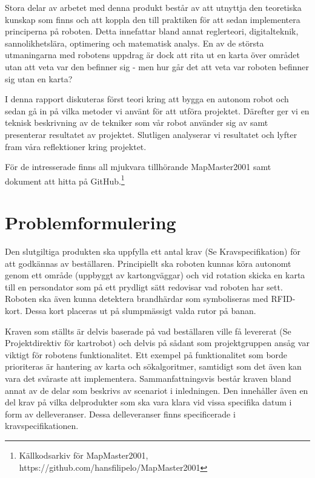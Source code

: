 \documentclass[a4paper,12pt,fleqn]{article}
\begin{document}
Stora delar av arbetet med denna produkt består av att utnyttja den teoretiska kunskap som finns och att koppla den till praktiken för att sedan implementera principerna på roboten. 
Detta innefattar bland annat reglerteori, digitalteknik, sannolikhetslära, optimering och matematisk analys. En av de största utmaningarna med robotens uppdrag är dock att rita ut en karta över området utan att veta var den befinner sig - men hur går det att veta var roboten befinner sig utan en karta?

I denna rapport diskuteras först teori kring att bygga en autonom robot och sedan gå in på vilka metoder vi använt för att utföra projektet. Därefter ger vi en teknisk beskrivning av de tekniker som vår robot använder sig av samt presenterar resultatet av projektet. Slutligen analyserar vi resultatet och lyfter fram våra reflektioner kring projektet. 

För de intresserade finns all mjukvara tillhörande MapMaster2001 samt dokument att hitta på GitHub.\footnote{Källkodsarkiv för MapMaster2001, https://github.com/hansfilipelo/MapMaster2001}

\section{Problemformulering}

Den slutgiltiga produkten ska uppfylla ett antal krav (Se Kravspecifikation) för att godkännas av beställaren. Principiellt ska roboten kunnas köra autonomt genom ett område (uppbyggt av kartongväggar) och vid rotation skicka en karta till en persondator som på ett prydligt sätt redovisar vad roboten har sett. Roboten ska även kunna detektera brandhärdar som symboliseras med RFID-kort. Dessa kort placeras ut på slumpmässigt valda rutor på banan. 

Kraven som ställts är delvis baserade på vad beställaren ville få levererat (Se Projektdirektiv för kartrobot) och delvis på sådant som projektgruppen ansåg var viktigt för robotens funktionalitet. Ett exempel på funktionalitet som borde prioriteras är hantering av karta och sökalgoritmer, samtidigt som det även kan vara det svåraste att implementera. Sammanfattningsvis består kraven bland annat av de delar som beskrivs av scenariot i inledningen. Den innehåller även en del krav på vilka delprodukter som ska vara klara vid vissa specifika datum i form av delleveranser. Dessa delleveranser finns specificerade i kravspecifikationen.
\end{document}
